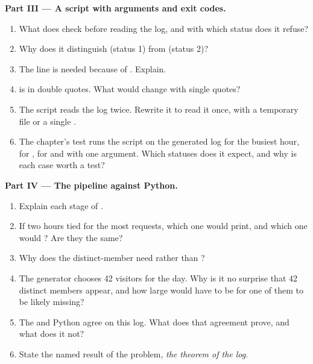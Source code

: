 \begin{problem}
\medskip\noindent\textbf{Part III --- A script with arguments and exit codes.}
\begin{enumerate}[resume]
\item What does  check before reading the log, and with which status does it refuse?
\item Why does it distinguish  (status 1) from  (status 2)?
\item The line  is needed because of . Explain.
\item {} is in double quotes. What would change with single quotes?
\item The script reads the log twice. Rewrite it to read it once, with a temporary file or a single .
\item The chapter's test runs the script on the generated log for the busiest hour, for , for  and with
one argument. Which statuses does it expect, and why is each case worth a test?
\end{enumerate}

\medskip\noindent\textbf{Part IV --- The pipeline against Python.}
\begin{enumerate}[resume]
\item Explain each stage of .
\item If two hours tied for the most requests, which one would  print, and which one would
? Are they the same?
\item Why does the distinct-member  need  rather than ?
\item The generator chooses 42 visitors for the day. Why is it no surprise that 42 distinct members appear, and how
large would  have to be for one of them to be likely missing?
\item The  and Python agree on this log. What does that agreement prove, and what does it not?
\item State the named result of the problem, \emph{the  theorem of the log}.
\end{enumerate}
\end{problem}
